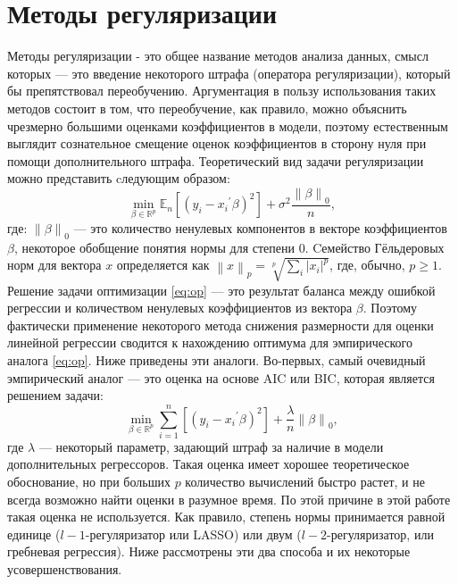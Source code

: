 \section{Методы регуляризации}
Методы регуляризации - это общее название методов анализа данных, смысл которых --- это введение некоторого штрафа (оператора регуляризации), который бы препятствовал переобучению. Аргументация в пользу использования таких методов состоит в том, что переобучение, как правило, можно объяснить чрезмерно большими оценками коэффициентов в модели, поэтому естественным выглядит сознательное смещение оценок коэффициентов в сторону нуля при помощи дополнительного штрафа. Теоретический вид задачи регуляризации можно представить cледующим образом:
\begin{equation}\label{eq:op}
    \min_{\beta \in
\mathbb{R}^p} \mathbb{E}_n\left[ (y_i - {x_i}^{'} \beta)^2 \right] + \sigma^2
\frac{\left\lVert \beta \right\rVert_0}{n}, 
\end{equation} 
где: $\left\lVert \beta \right\rVert_0$ --- это количество ненулевых компонентов в векторе коэффициентов $\beta$, некоторое обобщение понятия нормы для степени $0$. Cемейство Гёльдеровых норм для вектора $x$ определяется как $\left\lVert x \right\rVert_p = \sqrt[p]{\sum_i|x_i|^p}$, где, обычно, $p \geq 1$.
Решение задачи оптимизации \eqref{eq:op} --- это результат баланса между ошибкой регрессии и количеством ненулевых коэффициентов из вектора $\beta$. Поэтому фактически применение некоторого метода снижения размерности для оценки линейной регрессии сводится к нахождению оптимума для эмпирического аналога \eqref{eq:op}.
Ниже приведены эти аналоги.
Во-первых, самый очевидный эмпирический аналог --- это оценка на основе AIC или BIC, которая является решением задачи:
\begin{equation} \min_{\beta \in
\mathbb{R}^p} \sum_{i=1}^n \left[ (y_i - {x_i}^{'} \beta)^2 \right] +  \frac{\lambda}{n} \left\lVert \beta \right\rVert_0, 
\end{equation}
где $\lambda$ --- некоторый параметр, задающий штраф за наличие в модели дополнительных регрессоров. Такая оценка имеет хорошее теоретическое обоснование, но при больших $p$ количество вычислений быстро растет, и не всегда возможно найти оценки в разумное время. По этой причине в этой работе такая оценка не используется.  Как правило, степень нормы принимается равной единице ($l-1$-регуляризатор или LASSO) или двум ($l-2$-регуляризатор, или гребневая регрессия). Ниже рассмотрены эти два способа и их некоторые усовершенствования.
